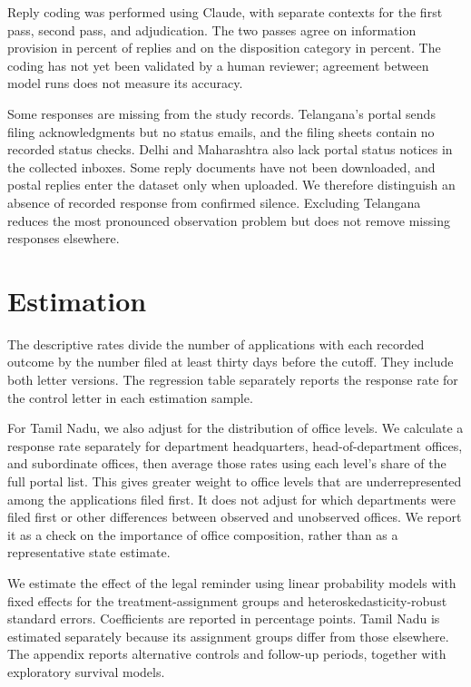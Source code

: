 \documentclass[11pt]{article}
\begin{document}
Reply coding was performed using Claude, with separate contexts for the first pass, second pass, and adjudication. The two passes agree on information provision in \rtiagreeinfo{} percent of replies and on the disposition category in \rtiagreedisp{} percent. The coding has not yet been validated by a human reviewer; agreement between model runs does not measure its accuracy.

Some responses are missing from the study records. Telangana's portal sends filing acknowledgments but no status emails, and the filing sheets contain no recorded status checks. Delhi and Maharashtra also lack portal status notices in the collected inboxes. Some reply documents have not been downloaded, and postal replies enter the dataset only when uploaded. We therefore distinguish an absence of recorded response from confirmed silence. Excluding Telangana reduces the most pronounced observation problem but does not remove missing responses elsewhere.

\section{Estimation}
The descriptive rates divide the number of applications with each recorded outcome by the number filed at least thirty days before the cutoff. They include both letter versions. The regression table separately reports the response rate for the control letter in each estimation sample.

For Tamil Nadu, we also adjust for the distribution of office levels. We calculate a response rate separately for department headquarters, head-of-department offices, and subordinate offices, then average those rates using each level's share of the full portal list. This gives greater weight to office levels that are underrepresented among the applications filed first. It does not adjust for which departments were filed first or other differences between observed and unobserved offices. We report it as a check on the importance of office composition, rather than as a representative state estimate.

We estimate the effect of the legal reminder using linear probability models with fixed effects for the treatment-assignment groups and heteroskedasticity-robust standard errors. Coefficients are reported in percentage points. Tamil Nadu is estimated separately because its assignment groups differ from those elsewhere. The appendix reports alternative controls and follow-up periods, together with exploratory survival models.
\end{document}
